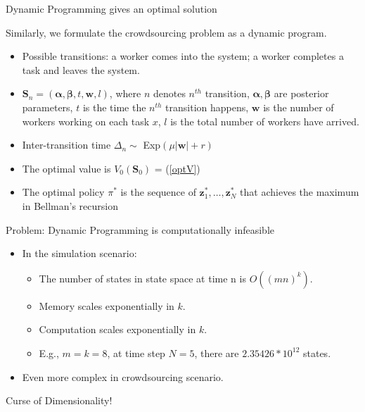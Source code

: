 \documentclass{beamer}
\newcommand{\Sv}{\mathbf{S}}
\newcommand{\betav}{\pmb{\beta}}
\newcommand{\alphav}{\pmb{\alpha}}
\newcommand{\zv}{\mathbf{z}}
\begin{document}
\begin{frame}{Dynamic Programming gives an optimal solution}

Similarly, we formulate the crowdsourcing problem as a dynamic program.
\begin{itemize}
\item Possible transitions: a worker comes into the system; a worker completes a task and leaves the system. 
\item $\Sv_n = (\alphav,\betav,t,\mathbf{w},l)$, where $n$ denotes $n^{th}$ transition, $\alphav,\betav$ are posterior parameters, $t$ is the time the $n^{th}$ transition happens, $\mathbf{w}$ is the number of workers working on each task $x$, $l$ is the total number of workers have arrived.
\item Inter-transition time $\Delta_n \sim$ Exp$(\mu|\mathbf{w}|+r)$
\item The optimal value is $V_0(\mathbf{S}_0)$ = (\ref{optV})
\item The optimal policy $\pi^*$ is the sequence of $\zv_1^*,\ldots,\zv_N^*$ that achieves the maximum in Bellman's recursion
\end{itemize}
\end{frame}

\begin{frame}{Problem: Dynamic Programming is computationally infeasible}

\begin{itemize}
\item In the simulation scenario:
\begin{itemize}
\item The number of states in state space at time n is $O((mn)^k)$.
\vspace{2mm}
\item Memory scales exponentially in $k$.
\vspace{2mm}
\item Computation scales exponentially in $k$.
\vspace{2mm}
\item E.g., $m = k = 8$, at time step $N=5$, there are $2.35426*10^{12}$ states.
\vspace{2mm}
\end{itemize}
\item Even more complex in crowdsourcing scenario.
\end{itemize}
{\Large \color{blue} Curse of Dimensionality!}\\
\end{frame}
\end{document}

